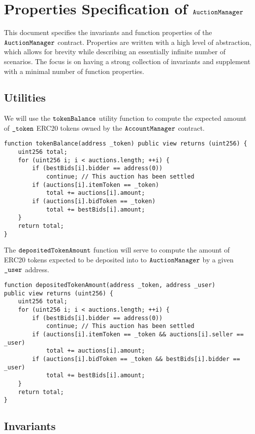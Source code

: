 \documentclass[a4paper,10pt]{article}
\begin{document}
\section*{Properties Specification of $\texttt{AuctionManager}$}

This document specifies the invariants and function properties of the $\texttt{AuctionManager}$
contract. Properties are written with a high level of abstraction, which allows for brevity while
describing an essentially infinite number of scenarios. The focus is on having a strong collection
of invariants and supplement with a minimal number of function properties.

\subsection*{Utilities}
We will use the $\texttt{tokenBalance}$ utility function to compute the expected amount of
$\texttt{\_token}$ ERC20 tokens owned by the $\texttt{AccountManager}$ contract.

\begin{lstlisting}
function tokenBalance(address _token) public view returns (uint256) {
    uint256 total;
    for (uint256 i; i < auctions.length; ++i) {
        if (bestBids[i].bidder == address(0))
            continue; // This auction has been settled
        if (auctions[i].itemToken == _token)
            total += auctions[i].amount;
        if (auctions[i].bidToken == _token)
            total += bestBids[i].amount;
    }
    return total;
}
\end{lstlisting}

The $\texttt{depositedTokenAmount}$ function will serve to compute the amount of ERC20 tokens
expected to be deposited into to $\texttt{AuctionManager}$ by a given $\texttt{\_user}$ address.

\begin{lstlisting}
function depositedTokenAmount(address _token, address _user)
public view returns (uint256) {
    uint256 total;
    for (uint256 i; i < auctions.length; ++i) {
        if (bestBids[i].bidder == address(0))
            continue; // This auction has been settled
        if (auctions[i].itemToken == _token && auctions[i].seller == _user)
            total += auctions[i].amount;
        if (auctions[i].bidToken == _token && bestBids[i].bidder == _user)
            total += bestBids[i].amount;
    }
    return total;
}
\end{lstlisting}

\subsection*{Invariants}
\end{document}
